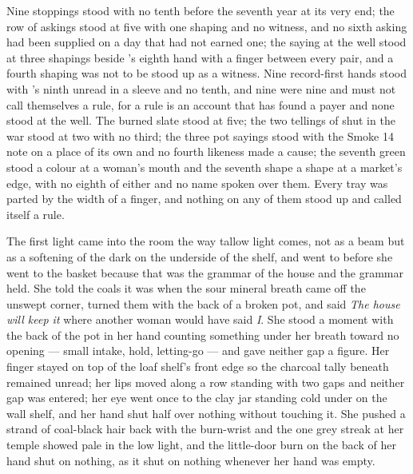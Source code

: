 Nine stoppings stood with no tenth before the seventh year at its very end; the row of askings stood at five with one shaping and no witness, and no sixth asking had been supplied on a day that had not earned one; the saying at the well stood at three shapings beside 's eighth hand with a finger between every pair, and a fourth shaping was not to be stood up as a witness. Nine record-first hands stood with 's ninth unread in a sleeve and no tenth, and nine were nine and must not call themselves a rule, for a rule is an account that has found a payer and none stood at the well. The burned slate stood at five; the two tellings of  shut in the war stood at two with no third; the three pot sayings stood with the Smoke 14 note on a place of its own and no fourth likeness made a cause; the seventh green stood a colour at a woman's mouth and the seventh shape a shape at a market's edge, with no eighth of either and no name spoken over them. Every tray was parted by the width of a finger, and nothing on any of them stood up and called itself a rule.

\scenebreak

The first light came into the room the way tallow light comes, not as a beam but as a softening of the dark on the underside of the shelf, and  went to  before she went to the basket because that was the grammar of the house and the grammar held. She told the coals it was  when the sour mineral breath came off the unswept corner, turned them with the back of a broken pot, and said \emph{The house will keep it} where another woman would have said \emph{I}. She stood a moment with the back of the pot in her hand counting something under her breath toward no opening --- small intake, hold, letting-go --- and gave neither gap a figure. Her finger stayed on top of the loaf shelf's front edge so the charcoal tally beneath remained unread; her lips moved along a row standing with two gaps and neither gap was entered; her eye went once to the clay jar standing cold under  on the wall shelf, and her hand shut half over nothing without touching it. She pushed a strand of coal-black hair back with the burn-wrist and the one grey streak at her temple showed pale in the low light, and the little-door burn on the back of her hand shut on nothing, as it shut on nothing whenever her hand was empty.

